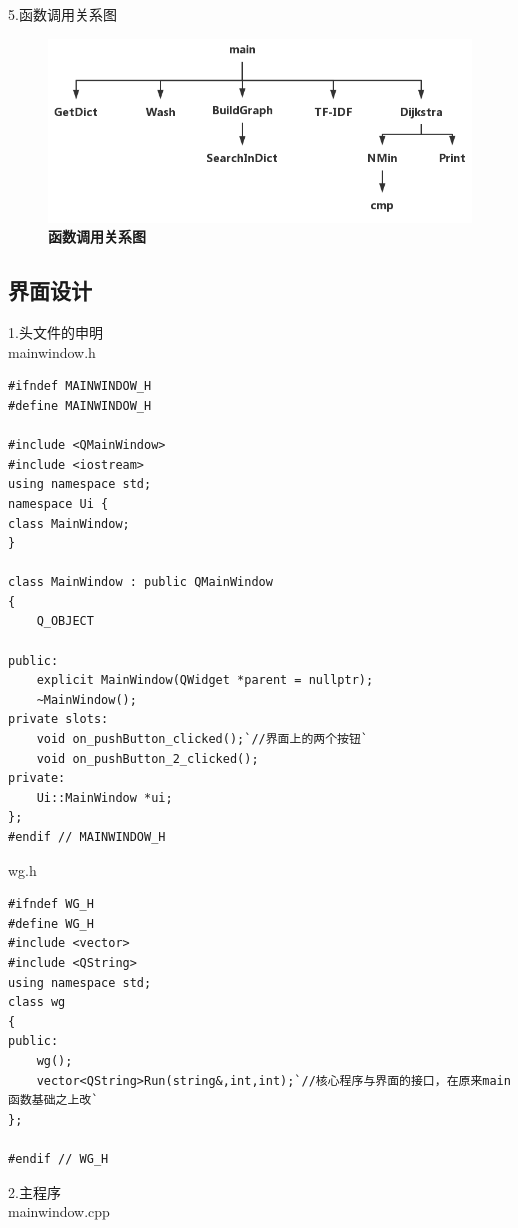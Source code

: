 \documentclass[UTF8]{ctexart}
\begin{document}
5.函数调用关系图
\begin{figure}[H]
\centerline{
\includegraphics[scale = .6]{relation.png}
}
\caption{\textbf{函数调用关系图}}
\end{figure}
\newpage
\subsection{界面设计}
1.头文件的申明\\
mainwindow.h\par
\begin{lstlisting}
#ifndef MAINWINDOW_H
#define MAINWINDOW_H

#include <QMainWindow>
#include <iostream>
using namespace std;
namespace Ui {
class MainWindow;
}

class MainWindow : public QMainWindow
{
    Q_OBJECT

public:
    explicit MainWindow(QWidget *parent = nullptr);
    ~MainWindow();
private slots:
    void on_pushButton_clicked();`//界面上的两个按钮`
    void on_pushButton_2_clicked();
private:
    Ui::MainWindow *ui;
};
#endif // MAINWINDOW_H
\end{lstlisting}
wg.h
\begin{lstlisting}
#ifndef WG_H
#define WG_H
#include <vector>
#include <QString>
using namespace std;
class wg
{
public:
    wg();
    vector<QString>Run(string&,int,int);`//核心程序与界面的接口，在原来main函数基础之上改`
};

#endif // WG_H
\end{lstlisting}
2.主程序\\
mainwindow.cpp
\end{document}

